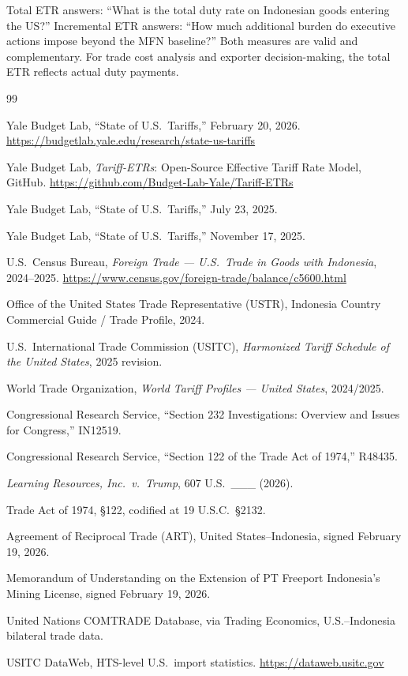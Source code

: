 \documentclass[12pt,a4paper]{article}
\begin{document}
Total ETR answers: ``What is the total duty rate on Indonesian goods entering the US?'' Incremental ETR answers: ``How much additional burden do executive actions impose beyond the MFN baseline?'' Both measures are valid and complementary. For trade cost analysis and exporter decision-making, the total ETR reflects actual duty payments.


\begin{thebibliography}{99}

Yale Budget Lab, ``State of U.S.\ Tariffs,'' February 20, 2026.
\url{https://budgetlab.yale.edu/research/state-us-tariffs}

Yale Budget Lab, \textit{Tariff-ETRs}: Open-Source Effective Tariff Rate Model, GitHub.
\url{https://github.com/Budget-Lab-Yale/Tariff-ETRs}

Yale Budget Lab, ``State of U.S.\ Tariffs,'' July 23, 2025.

Yale Budget Lab, ``State of U.S.\ Tariffs,'' November 17, 2025.

U.S.\ Census Bureau, \textit{Foreign Trade --- U.S.\ Trade in Goods with Indonesia}, 2024--2025.
\url{https://www.census.gov/foreign-trade/balance/c5600.html}

Office of the United States Trade Representative (USTR), Indonesia Country Commercial Guide / Trade Profile, 2024.

U.S.\ International Trade Commission (USITC), \textit{Harmonized Tariff Schedule of the United States}, 2025 revision.

World Trade Organization, \textit{World Tariff Profiles --- United States}, 2024/2025.

Congressional Research Service, ``Section 232 Investigations: Overview and Issues for Congress,'' IN12519.

Congressional Research Service, ``Section 122 of the Trade Act of 1974,'' R48435.

\textit{Learning Resources, Inc.\ v.\ Trump}, 607 U.S.\ \_\_\_ (2026).

Trade Act of 1974, \S 122, codified at 19 U.S.C.\ \S 2132.

Agreement of Reciprocal Trade (ART), United States--Indonesia, signed February 19, 2026.

Memorandum of Understanding on the Extension of PT Freeport Indonesia's Mining License, signed February 19, 2026.

United Nations COMTRADE Database, via Trading Economics, U.S.--Indonesia bilateral trade data.

USITC DataWeb, HTS-level U.S.\ import statistics.
\url{https://dataweb.usitc.gov}

\end{thebibliography}
\end{document}
